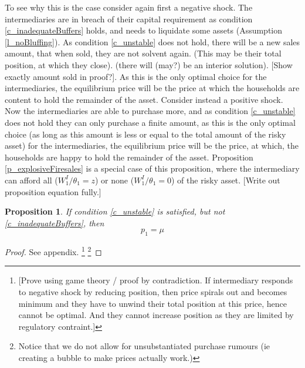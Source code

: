 \documentclass[11pt]{article}
\newtheorem{proposition}{Proposition}
\begin{document}
To see why this is the case consider again first a negative shock. The intermediaries are in breach of their capital requirement as condition \ref{c_inadequateBuffers} holds, and needs to liquidate some assets (Assumption \ref{l_noBluffing}). As condition \ref{c_unstable} does not hold, there will be a new sales amount, that when sold, they are not solvent again. (This may be their total position, at which they close). (there will (may?) be an interior solution). [Show exactly amount sold in proof?]. As this is the only optimal choice for the intermediaries, the equilibrium price will be the price at which the households are content to hold the remainder of the asset. Consider instead a positive shock. Now the intermediaries are able to purchase more, and as condition \ref{c_unstable} does not hold they can only purchase a finite amount, as this is the only optimal choice (as long as this amount is less or equal to the total amount of the risky asset) for the intermediaries, the equilibrium price will be the price, at which, the households are happy to hold the remainder of the asset. Proposition \ref{p_explosiveFiresales} is a special case of this proposition, where the intermediary can afford all ($W^I_1/\theta_1 = z$) or none ($W^I_1/\theta_1 = 0$) of the risky asset. [Write out proposition equation fully.]



\begin{proposition} \label{p_pricewBuffer}
If condition \ref{c_unstable} is satisfied, but not \ref{c_inadequateBuffers}, then 
\begin{equation}
p_1 = \mu
\end{equation}
\end{proposition}
\begin{proof}
See appendix.
\footnote{[Prove using game theory / proof by contradiction. If intermediary responds to negative shock by reducing position, then price spirals out and becomes minimum and they have to unwind their total position at this price, hence cannot be optimal. And they cannot increase position as they are limited by regulatory contraint.]}
\footnote{Notice that we do not allow for unsubstantiated purchase rumours (ie creating a bubble to make prices actually work.)}
\end{proof}
\end{document}
